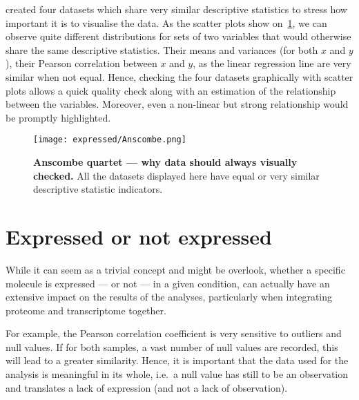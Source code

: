 \cite{anscombe} created four datasets which share very similar descriptive
statistics to stress how important it is to visualise the data. As the scatter
plots show on~\cref{fig:Anscombe}, we can observe quite different distributions
for sets of two variables that would otherwise share the same descriptive
statistics. Their means and variances  (for both $x$ and $y$),
their Pearson correlation between $x$ and $y$, as
the linear regression line are very similar when not equal.
Hence, checking the four datasets graphically with scatter plots
allows a quick quality check along with an
estimation of the relationship between the variables. Moreover, even a non-linear
but strong relationship would be promptly highlighted.

\begin{figure}[!htbp]
    \texttt{[image: expressed/Anscombe.png]}\centering
      \caption[Anscombe quartet --- why data should always visualy checked]
      {\label{fig:Anscombe}\textbf{Anscombe quartet --- why data should always
      visually checked.}\smallbreak{} All the datasets displayed here have equal
      or very similar descriptive statistic indicators.}
\end{figure}

\section{Expressed or not expressed}
\label{sec:ExpressedOrNot}

While it can seem as a trivial concept and might be overlook, whether a specific
molecule is expressed --- or not --- in a given condition, can actually have
an extensive impact on the results of the analyses, particularly when integrating
proteome and transcriptome together.

For example, the Pearson correlation coefficient is very
sensitive to outliers and null values. If for both samples, a vast number of
null values are recorded, this will lead to a greater similarity.
Hence, it is important that the data used for the analysis is meaningful in
its whole, i.e.\ a null value has still to be an observation and translates
a lack of expression (and not a lack of observation).

